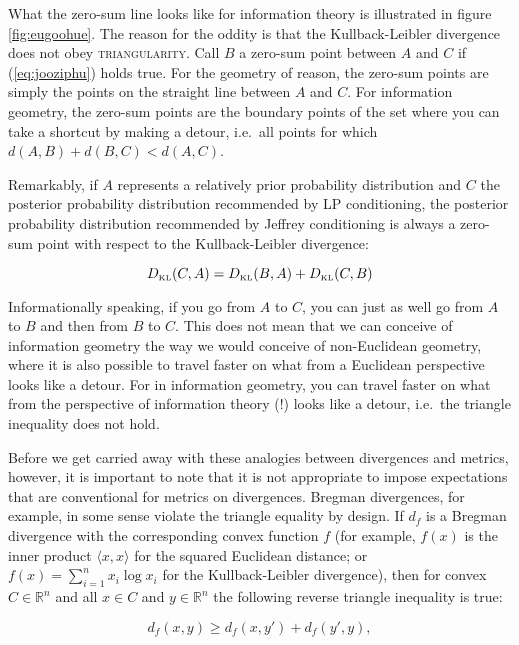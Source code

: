 \documentclass[smallextended]{svjour3}       %
\begin{document}
What the zero-sum line looks like for information theory is
illustrated in figure \ref{fig:eugoohue}. The reason for the oddity is
that the Kullback-Leibler divergence does not obey
\textsc{triangularity}. Call $B$ a zero-sum point between $A$ and $C$
if (\ref{eq:jooziphu}) holds true. For the geometry of reason, the
zero-sum points are simply the points on the straight line between $A$
and $C$. For information geometry, the zero-sum points are the
boundary points of the set where you can take a shortcut by making a
detour, i.e.\ all points for which $d(A,B)+d(B,C)<d(A,C)$.

Remarkably, if $A$ represents a relatively prior probability
distribution and $C$ the posterior probability distribution
recommended by LP conditioning, the posterior probability distribution
recommended by Jeffrey conditioning is always a zero-sum point with
respect to the Kullback-Leibler divergence:

\begin{equation}
  \label{eq:ocidocho}
  D_{\mbox{\tiny KL}}(C,A)=D_{\mbox{\tiny KL}}(B,A)+D_{\mbox{\tiny KL}}(C,B)
\end{equation}

Informationally speaking, if you go from $A$ to $C$, you can just as
well go from $A$ to $B$ and then from $B$ to $C$. This does not mean
that we can conceive of information geometry the way we would conceive
of non-Euclidean geometry, where it is also possible to travel faster
on what from a Euclidean perspective looks like a detour. For in
information geometry, you can travel faster on what from the
perspective of information theory (!) looks like a detour, i.e.\ the
triangle inequality does not hold. 

Before we get carried away with these analogies between divergences
and metrics, however, it is important to note that it is not
appropriate to impose expectations that are conventional for metrics
on divergences. Bregman divergences, for example, in some sense
violate the triangle equality by design. If $d_{f}$ is a Bregman
divergence with the corresponding convex function $f$ (for example,
$f(x)$ is the inner product $\langle{}x,x\rangle$ for the squared
Euclidean distance; or $f(x)=\sum_{i=1}^{n}{}x_{i}\log{}x_{i}$ for the
Kullback-Leibler divergence), then for convex $C\in\mathbb{R}^{n}$ and
all $x\in{}C$ and $y\in\mathbb{R}^{n}$ the following reverse triangle
inequality is true: 

\begin{equation}
\label{eq:aiphaiho}
d_{f}(x,y)\geq{}d_{f}(x,y')+d_{f}(y',y), 
\end{equation}
\end{document}

